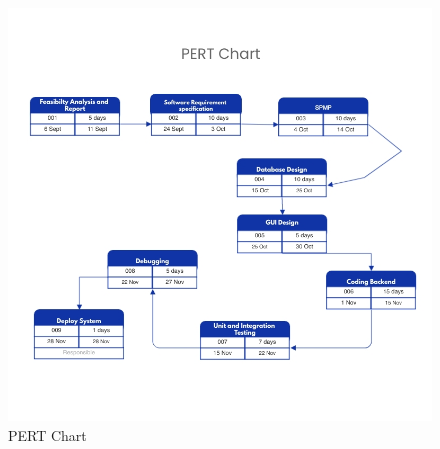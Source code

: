 \documentclass[12pt]{report}
\begin{document}
\begin{figure}[h]
\centering
\includegraphics[width=15cm]{New-System-Implementation-PERT-Chart.jpg}
\caption{PERT Chart}
\end{figure}

\printindex
\end{document}
